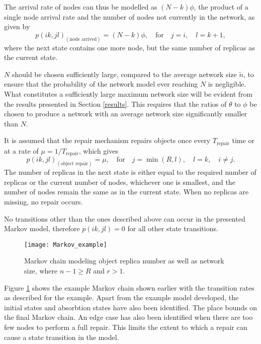 The arrival rate of nodes can thus be modelled as $(N - k)\phi$, the product of a single node arrival rate and the number of nodes not currently in the network, as given by
%
\begin{equation} \label{eq_node_arrived}
    p(i k,j l)_{(\textrm{node arrived})} = (N - k)\phi,\quad\textrm{for}\quad j = i,\quad l = k + 1,
\end{equation}
%
where the next state contains one more node, but the same number of replicas as the current state.


$N$ should be chosen sufficiently large, compared to the average network size $\tilde{n}$, to ensure that the probability of the network model ever reaching $N$ is negligible. What constitutes a sufficiently large maximum network size will be evident from the results presented in Section \ref{results}. This requires that the ratios of $\theta$ to $\phi$ be chosen to produce a network with an average network size significantly smaller than $N$.

It is assumed that the repair mechanism repairs objects once every $T_{\textrm{repair}}$ time or at a rate of $\mu = 1/T_{\textrm{repair}}$, which gives
%
\begin{equation} \label{eq_repair}
    p(i k,j l)_{(\textrm{object repair})} = \mu,\quad\textrm{for}\quad j = \min(R, l),\quad l = k,\quad i \neq j.
\end{equation}
%
The number of replicas in the next state is either equal to the required number of replicas or the current number of nodes, whichever one is smallest, and the number of nodes remain the same as in the current state. When no replicas are missing, no repair occurs.

No transitions other than the ones described above can occur in the presented Markov model, therefore $p(i k,j l) = 0$ for all other state transitions.

\begin{figure}[htbp]
 \centering
 \texttt{[image: Markov\_example]}
 \caption{Markov chain modeling object replica number as well as network size, where $n-1\geqslant R$ and $r > 1$.}
 \label{fig_markov_example}
\end{figure}
%
Figure \ref{fig_markov_example} shows the example Markov chain shown earlier with the transition rates as described for the example. Apart from the example model developed, the initial states and absorbtion states have also been identified. The place bounds on the final Markov chain. An edge case has also been identified when there are too few nodes to perform a full repair. This limits the extent to which a repair can cause a state transition in the model.

